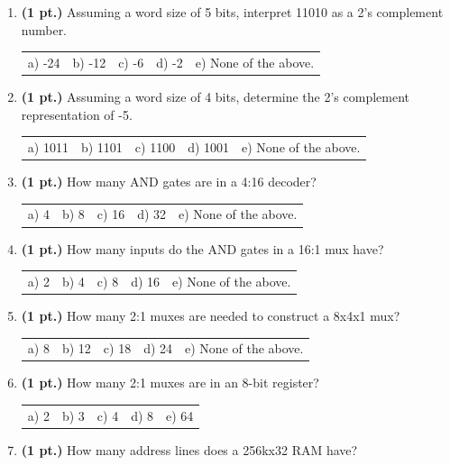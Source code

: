 \documentclass{article}
\begin{document}
\begin{enumerate}
\item {\bf (1 pt.)} Assuming a word size of 5 bits, interpret 11010 as a 2's complement
number.

\begin{tabular}{p{0.6in} p{0.6in} p{0.6in} p{0.6in} l}
a) -24 & b) -12 & c) -6 & d) -2 & e) None of the above.
\end{tabular}

\item {\bf (1 pt.)} Assuming a word size of 4 bits, determine the 2's complement
representation of -5.

\begin{tabular}{p{0.6in} p{0.6in} p{0.6in} p{0.6in} l}
a) 1011 & b) 1101 & c) 1100 & d) 1001 & e) None of the above.
\end{tabular}

\item {\bf (1 pt.)} How many AND gates are in a 4:16 decoder?

\begin{tabular}{p{0.6in} p{0.6in} p{0.6in} p{0.6in} l}
a) 4 & b) 8 & c) 16 & d) 32 & e) None of the above.
\end{tabular}


\item {\bf (1 pt.)} How many inputs do the AND gates in a 16:1 mux have?

\begin{tabular}{p{0.6in} p{0.6in} p{0.6in} p{0.6in} l}
a) 2 & b) 4 & c) 8 & d) 16 & e) None of the above.
\end{tabular}

\item {\bf (1 pt.)} How many 2:1 muxes are needed to construct a 8x4x1 mux?

\begin{tabular}{p{0.6in} p{0.6in} p{0.6in} p{0.6in} l}
a) 8 & b) 12 & c) 18 & d) 24 & e) None of the above.
\end{tabular}

\item {\bf (1 pt.)} How many 2:1 muxes are in an 8-bit register?

\begin{tabular}{p{0.6in} p{0.6in} p{0.6in} p{0.6in} l}
a) 2 & b) 3 & c) 4 & d) 8 & e) 64
\end{tabular}

\item {\bf (1 pt.)} How many address lines does a 256kx32 RAM have?


\end{enumerate}
\end{document}
